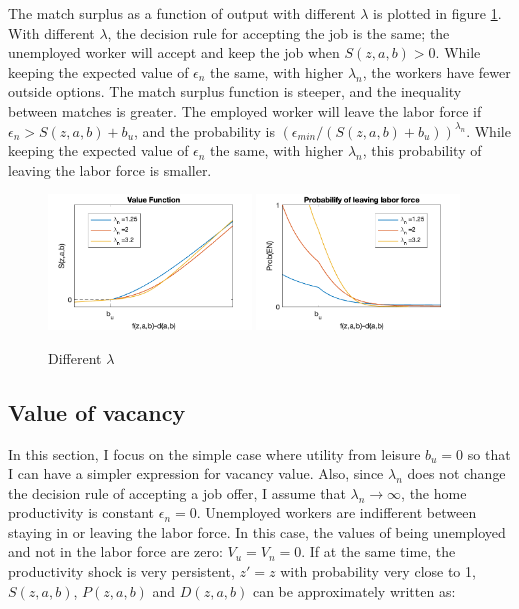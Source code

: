 \documentclass[12pt]{article}
\newcommand{\1}{\mathbb{1}}
\begin{document}
The match surplus as a function of output with different $\lambda$ is plotted in figure \ref{Analytical1}. With different $\lambda$, the decision rule for accepting the job is the same; the unemployed worker will accept and keep the job when $S(z,a,b)>0$. While keeping the expected value of $\epsilon_n$ the same, with higher $\lambda_n$, the workers have fewer outside options. The match surplus function is steeper, and the inequality between matches is greater. The employed worker will leave the labor force if $\epsilon_n>S(z,a,b)+b_u$, and the probability is $(\epsilon_{min}/(S(z,a,b)+b_u))^{\lambda_n}$.  While keeping the expected value of $\epsilon_n$ the same, with higher $\lambda_n$, this probability of leaving the labor force is smaller. \\
\begin{figure}[h!]
\centering
\includegraphics[width=0.48\textwidth]{Analytical2_1}
\includegraphics[width=0.48\textwidth]{Analytical2_2}
\caption{Different $\lambda$}
\label{Analytical1}
\end{figure}

\subsection{Value of vacancy}
In this section, I focus on the simple case where utility from leisure $b_u = 0$ so that I can have a simpler expression for vacancy value. Also, since $\lambda_n$ does not change the decision rule of accepting a job offer, I assume that $\lambda_n \to \infty$, the home productivity is constant $\epsilon_n = 0$. Unemployed workers are indifferent between staying in or leaving the labor force. In this case, the values of being unemployed and not in the labor force are zero: $V_u = V_n = 0$. If at the same time, the productivity shock is very persistent, $z' = z$ with probability very close to 1, $S(z,a,b)$, $P(z,a,b)$ and $D(z,a,b)$ can be approximately written as: 
\end{document}
